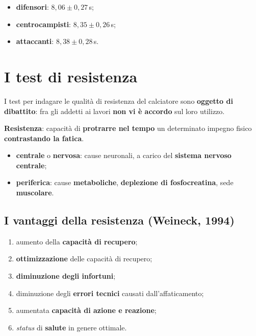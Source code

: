 \begin{itemize}
  \item \textbf{difensori}: $8{,}06 \pm 0{,}27$\,s;
  \item \textbf{centrocampisti}: $8{,}35 \pm 0{,}26$\,s;
  \item \textbf{attaccanti}: $8{,}38 \pm 0{,}28$\,s.
\end{itemize}

\section{I test di resistenza}

I test per indagare le qualità di resistenza del calciatore sono \textbf{oggetto di dibattito}: fra
gli addetti ai lavori \textbf{non vi è accordo} sul loro utilizzo.

\textbf{Resistenza}: capacità di \textbf{protrarre nel tempo} un determinato impegno fisico
\textbf{contrastando la fatica}.

\begin{itemize}
  \item \textbf{centrale} o \textbf{nervosa}: cause neuronali, a carico del \textbf{sistema nervoso
    centrale};
  \item \textbf{periferica}: cause \textbf{metaboliche}, \textbf{deplezione di fosfocreatina}, sede
    \textbf{muscolare}.
\end{itemize}

\subsection{I vantaggi della resistenza (Weineck, 1994)}

\begin{enumerate}
  \item aumento della \textbf{capacità di recupero};
  \item \textbf{ottimizzazione} delle capacità di recupero;
  \item \textbf{diminuzione degli infortuni};
  \item diminuzione degli \textbf{errori tecnici} causati dall'affaticamento;
  \item aumentata \textbf{capacità di azione e reazione};
  \item \textit{status} di \textbf{salute} in genere ottimale.
\end{enumerate}

